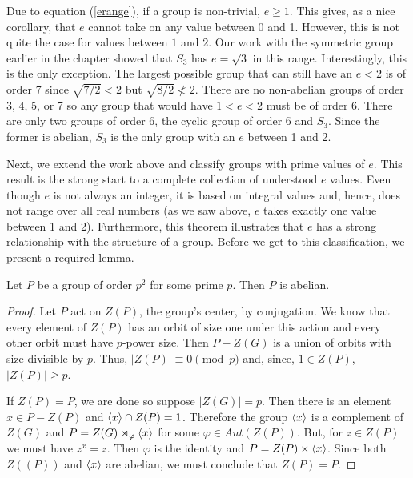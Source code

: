 \documentclass[main.tex]{subfiles}
\begin{document}
Due to equation (\ref{erange}), if a group is non-trivial, $e \ge 1$. This gives, as a nice corollary, that $e$ cannot take on any value between 0 and 1. However, this is not quite the case for values between $1$ and $2$. Our work with the symmetric group earlier in the chapter showed that $S_3$ has $e = \sqrt{3}$ in this range. Interestingly, this is the only exception. The largest possible group that can still have an $e < 2$ is of order 7 since $\sqrt{7/2} < 2$ but $\sqrt{8/2} \not< 2$. There are no non-abelian groups of order 3, 4, 5, or 7 so any group that would have $1 < e < 2$ must be of order 6. There are only two groups of order 6, the cyclic group of order 6 and $S_3$. Since the former is abelian, $S_3$ is the only group with an $e$ between 1 and 2.

\hss

Next, we extend the work above and classify groups with prime values of $e$. This result is the strong start to a complete collection of understood $e$ values. Even though $e$ is not always an integer, it is based on integral values and, hence, does not range over all real numbers (as we saw above, $e$ takes exactly one value between 1 and 2). Furthermore, this theorem illustrates that $e$ has a strong relationship with the structure of a group. Before we get to this classification, we present a required lemma.

\begin{lemma}\label{psquared}
Let $P$ be a group of order $p^2$ for some prime $p$. Then $P$ is abelian.
\end{lemma}

\begin{proof}
Let $P$ act on $Z(P)$, the group's center, by conjugation. We know that every element of $Z(P)$ has an orbit of size one under this action and every other orbit must have $p$-power size. Then $P - Z(G)$ is a union of orbits with size divisible by $p$. Thus, $|Z(P)| \equiv 0 \pmod{p}$ and, since, $1 \in Z(P)$, $|Z(P)| \ge p$. 

If $Z(P) = P$, we are done so suppose $|Z(G)| = p$. Then there is an element $x \in P - Z(P)$ and $\langle x \rangle \cap Z(P) = 1$. Therefore the group $\langle x \rangle$ is  a complement of $Z(G)$ and $P = Z(G) \rtimes_\varphi \langle x \rangle$ for some $\varphi \in Aut(Z(P))$. But, for $z \in Z(P)$ we must have $z^x = z$. Then $\varphi$ is the identity and $P = Z(P) \times \langle x \rangle$. Since both $Z((P))$ and $\langle x \rangle$ are abelian, we must conclude that $Z(P) = P$.
\end{proof}
\end{document}
